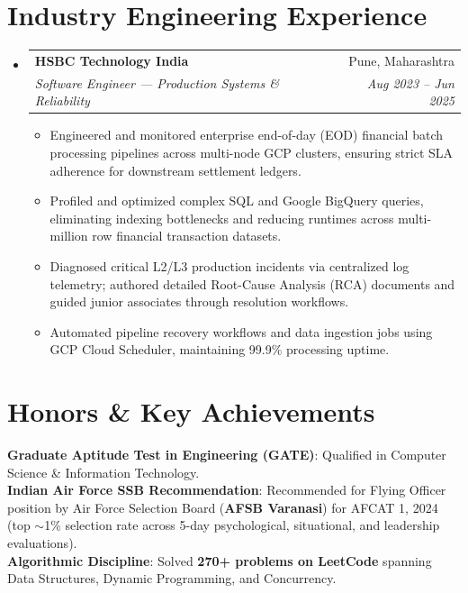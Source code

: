 \documentclass[letterpaper,10pt]{article}
\makeatletter
\newcommand{\resumeItem}[1]{
  \item\small{
    {#1 \vspace{-2pt}}
  }
}
\newcommand{\resumeSubheading}[4]{
  \vspace{-2pt}\item
    \begin{tabular*}{0.97\textwidth}[t]{l@{\extracolsep{\fill}}r}
      \textbf{#1} & #2 \\
      \textit{\small#3} & \textit{\small #4} \\
    \end{tabular*}\vspace{-5pt}
}
\newcommand{\resumeSubHeadingListStart}{\begin{itemize}[leftmargin=0.15in, label={}]}
\newcommand{\resumeSubHeadingListEnd}{\end{itemize}}
\newcommand{\resumeItemListStart}{\begin{itemize}[leftmargin=0.15in]}
\newcommand{\resumeItemListEnd}{\end{itemize}\vspace{-4pt}}
\makeatother
\begin{document}
\section{Industry Engineering Experience}
  \resumeSubHeadingListStart
    \resumeSubheading
      {HSBC Technology India}{Pune, Maharashtra}
      {Software Engineer — Production Systems \& Reliability}{Aug 2023 -- Jun 2025}
      \resumeItemListStart
        \resumeItem{Engineered and monitored enterprise end-of-day (EOD) financial batch processing pipelines across multi-node GCP clusters, ensuring strict SLA adherence for downstream settlement ledgers.}
        \resumeItem{Profiled and optimized complex SQL and Google BigQuery queries, eliminating indexing bottlenecks and reducing runtimes across multi-million row financial transaction datasets.}
        \resumeItem{Diagnosed critical L2/L3 production incidents via centralized log telemetry; authored detailed Root-Cause Analysis (RCA) documents and guided junior associates through resolution workflows.}
        \resumeItem{Automated pipeline recovery workflows and data ingestion jobs using GCP Cloud Scheduler, maintaining 99.9\% processing uptime.}
      \resumeItemListEnd
  \resumeSubHeadingListEnd

\section{Honors \& Key Achievements}
 \begin{itemize}[leftmargin=0.15in, label={}]
    \small{\item{
     \textbf{Graduate Aptitude Test in Engineering (GATE)}: Qualified in Computer Science \& Information Technology. \\
     \textbf{Indian Air Force SSB Recommendation}: Recommended for Flying Officer position by Air Force Selection Board (\textbf{AFSB Varanasi}) for AFCAT 1, 2024 (top $\sim$1\% selection rate across 5-day psychological, situational, and leadership evaluations). \\
     \textbf{Algorithmic Discipline}: Solved \textbf{270+ problems on LeetCode} spanning Data Structures, Dynamic Programming, and Concurrency.
    }}
 \end{itemize}
\end{document}
